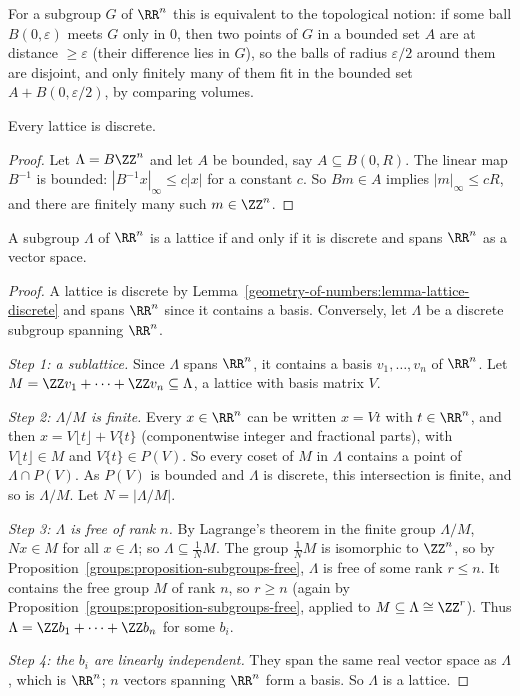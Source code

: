 For a subgroup $G$ of $\RR^n$ this is equivalent to the topological notion: if some ball $B(0, \varepsilon)$ meets $G$ only in $0$, then two points of $G$ in a bounded set $A$ are at distance
$\geq \varepsilon$ (their difference lies in $G$), so the balls of radius $\varepsilon/2$ around them are disjoint, and only finitely many of them fit in the bounded set $A + B(0, \varepsilon/2)$,
by comparing volumes.

\begin{lemma}\label{geometry-of-numbers:lemma-lattice-discrete}
Every lattice is discrete.
\end{lemma}

\begin{proof}
Let $\Lambda = B\ZZ^n$ and let $A$ be bounded, say $A \subseteq B(0, R)$. The linear map $B^{-1}$ is bounded: $|B^{-1}x|_\infty \leq c|x|$ for a constant $c$. So $Bm \in A$ implies
$|m|_\infty \leq cR$, and there are finitely many such $m \in \ZZ^n$.
\end{proof}

\begin{theorem}\label{geometry-of-numbers:theorem-discrete}
A subgroup $\Lambda$ of $\RR^n$ is a lattice if and only if it is discrete and spans $\RR^n$ as a vector space.
\end{theorem}

\begin{proof}
A lattice is discrete by Lemma~\ref{geometry-of-numbers:lemma-lattice-discrete} and spans $\RR^n$ since it contains a basis. Conversely, let $\Lambda$ be a discrete subgroup spanning $\RR^n$.

\emph{Step 1: a sublattice.} Since $\Lambda$ spans $\RR^n$, it contains a basis $v_1, \ldots, v_n$ of $\RR^n$. Let $M = \ZZ v_1 + \cdots + \ZZ v_n \subseteq \Lambda$, a lattice with basis matrix $V$.

\emph{Step 2: $\Lambda/M$ is finite.} Every $x \in \RR^n$ can be written $x = Vt$ with $t \in \RR^n$, and then $x = V\lfloor t \rfloor + V\{t\}$ (componentwise integer and fractional parts), with
$V\lfloor t \rfloor \in M$ and $V\{t\} \in P(V)$. So every coset of $M$ in $\Lambda$ contains a point of $\Lambda \cap P(V)$. As $P(V)$ is bounded and $\Lambda$ is discrete, this intersection
is finite, and so is $\Lambda/M$. Let $N = |\Lambda/M|$.

\emph{Step 3: $\Lambda$ is free of rank $n$.} By Lagrange's theorem in the finite group $\Lambda/M$, $Nx \in M$ for all $x \in \Lambda$; so $\Lambda \subseteq \frac1NM$. The group $\frac1NM$ is
isomorphic to $\ZZ^n$, so by Proposition~\ref{groups:proposition-subgroups-free}, $\Lambda$ is free of some rank $r \leq n$. It contains the free group $M$ of rank $n$, so $r \geq n$ (again by
Proposition~\ref{groups:proposition-subgroups-free}, applied to $M \subseteq \Lambda \cong \ZZ^r$). Thus $\Lambda = \ZZ b_1 + \cdots + \ZZ b_n$ for some $b_i$.

\emph{Step 4: the $b_i$ are linearly independent.} They span the same real vector space as $\Lambda$, which is $\RR^n$; $n$ vectors spanning $\RR^n$ form a basis. So $\Lambda$ is a lattice.
\end{proof}

